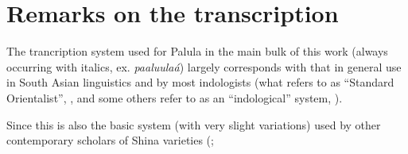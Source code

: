 

\section{Remarks on the transcription}
\label{sec:1-7}

The trancription system used for Palula in the main bulk of this work (always occurring with
italics, ex. \textit{paaluulaá}) largely corresponds with that in general use in South Asian
linguistics and by most indologists (what \citeauthor{masica1991} refers to as ``Standard
Orientalist'', \citeyear[xv]{masica1991}, and some others refer to as an ``indological'' system,
\citealt[9]{radloff1999}).


Since this is also the basic system (with very slight variations) used by other contemporary
scholars of Shina varieties
(\citealt{buddruss1987,buddruss1993,buddruss1996,schmidtkohistani2001,schmidtkohistani2008,schmidt2000,schmidt2001,schmidt2002,schmidt2003,schmidt2004,radloff1992,radloff1999};
